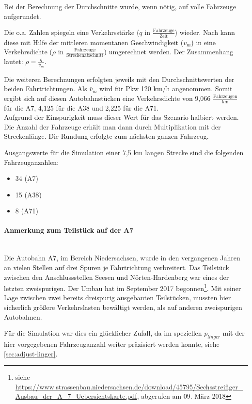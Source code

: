 \noindent
Bei der Berechnung der Durchschnitte wurde, wenn nötig, auf volle Fahrzeuge aufgerundet.

Die o.a. Zahlen spiegeln eine Verkehrsstärke ($q$ in $ \frac{\text{Fahrzeuge}}{\text{Zeit}} $) wieder.
Nach \cite{verkehrsplanung} kann diese mit Hilfe der mittleren momentanen Geschwindigkeit ($\overline{v}_{m}$) in eine Verkehrsdichte ($\rho$ in $ \frac{\text{Fahrzeuge}}{\text{Streckenabschnitt}} $) umgerechnet werden.
Der Zusammenhang lautet: $ \rho = \frac{q}{\overline{v}_{m}} $.

Die weiteren Berechnungen erfolgten jeweils mit den Durchschnittswerten der beiden Fahrtrichtungen.
Als $\overline{v}_{m}$ wird für Pkw 120 km/h angenommen.
Somit ergibt sich auf diesen Autobahnstücken eine Verkehrsdichte von 9,066 $\frac{\text{Fahrzeugen}}{\text{km}}$ für die A7, 4,125 für die A38 und 2,225 für die A71.
\\
Aufgrund der Einspurigkeit muss dieser Wert für das Szenario halbiert werden. 
Die Anzahl der Fahrzeuge erhält man dann durch Multiplikation mit der Streckenlänge.
Die Rundung erfolgte zum nächsten ganzen Fahrzeug.

Ausgangswerte für die Simulation einer 7,5 km langen Strecke sind die folgenden Fahrzeuganzahlen: 
\begin{itemize}
	\itemsep0em
	\item 34 (A7)
	\item 15 (A38)
	\item 8 (A71)
\end{itemize}

\paragraph*{Anmerkung zum Teilstück auf der A7}
\hfill \\
Die Autobahn A7, im Bereich Niedersachsen, wurde in den vergangenen Jahren an vielen Stellen auf drei Spuren je Fahrtrichtung verbreitert.
Das Teilstück zwischen den Anschlussstellen Seesen und Nörten-Hardenberg war eines der letzten zweispurigen.
Der Umbau hat im September 2017 begonnen\footnote{siehe \url{https://www.strassenbau.niedersachsen.de/download/45795/Sechsstreifiger_Ausbau_der_A_7_Uebersichtskarte.pdf}, abgerufen am 09. März 2018}.
Mit seiner Lage zwischen zwei bereits dreispurig ausgebauten Teilstücken, mussten hier sicherlich größere Verkehrslasten bewältigt werden, als auf anderen zweispurigen Autobahnen.

Für die Simulation war dies ein glücklicher Zufall, da im speziellen $p_{linger}$ mit der hier vorgegebenen Fahrzeuganzahl weiter präzisiert werden konnte, siehe \cref{sec:adjust-linger}.




